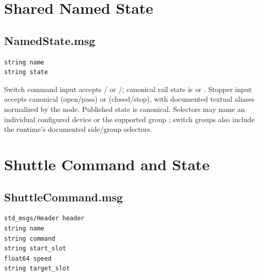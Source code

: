 \section{Shared Named State}

\subsection{NamedState.msg}

\begin{lstlisting}
string name
string state
\end{lstlisting}

Switch command input accepts / or
/; canonical rail state is  or .
Stopper input accepts canonical  (open/pass) or 
(closed/stop), with documented textual aliases normalized by the node. Published
state is canonical. Selectors may name an individual configured device or the
supported group ; switch groups also include the runtime's documented
side/group selectors.

\section{Shuttle Command and State}

\subsection{ShuttleCommand.msg}

\begin{lstlisting}
std_msgs/Header header
string name
string command
string start_slot
float64 speed
string target_slot
\end{lstlisting}

